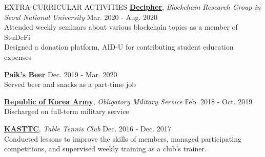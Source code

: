 \documentclass[10pt]{resume} %
\begin{document}

\begin{rSection}{EXTRA-CURRICULAR ACTIVITIES}
%
{\bf \href{https://decipher.ac/}{Decipher}}, \textit{Blockchain Research Group in Seoul National University} \hfill Mar. 2020 - Aug. 2020\\
Attended weekly seminars about various blockchain topics as a member of StuDeFi \\
Designed a donation platform, AID-U for contributing student education expenses

{\bf \href{http://paiksbeer.com/}{Paik’s Beer}} \hfill Dec. 2019 - Mar. 2020\\
Served beer and snacks as a part-time job

{\bf \href{https://www.army.mil.kr/}{Republic of Korea Army}}, \textit{Obligatory Military Service} \hfill Feb. 2018 - Oct. 2019\\
Discharged on full-term military service

{\bf \href{http://kasttc.kr/}{KASTTC}}, \textit{Table Tennis Club} \hfill Dec. 2016 - Dec. 2017\\
Conducted lessons to improve the skills of members, managed participating competitions, and supervised weekly training as a club's trainer.

\end{rSection}


%
\end{document}

